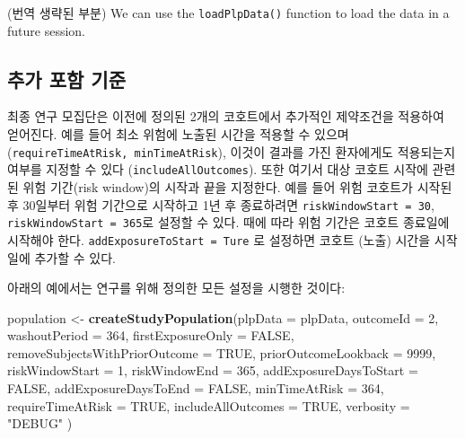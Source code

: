 \documentclass[10.5pt]{book}
\newenvironment{Shaded}{\begin{snugshade}}{\end{snugshade}}
\newcommand{\KeywordTok}[1]{\textcolor[rgb]{0.13,0.29,0.53}{\textbf{#1}}}
\newcommand{\DataTypeTok}[1]{\textcolor[rgb]{0.13,0.29,0.53}{#1}}
\newcommand{\DecValTok}[1]{\textcolor[rgb]{0.00,0.00,0.81}{#1}}
\newcommand{\StringTok}[1]{\textcolor[rgb]{0.31,0.60,0.02}{#1}}
\newcommand{\OtherTok}[1]{\textcolor[rgb]{0.56,0.35,0.01}{#1}}
\newcommand{\NormalTok}[1]{#1}
\theoremstyle{definition}
\theoremstyle{definition}
\theoremstyle{definition}
\theoremstyle{remark}
\begin{document}
(번역 생략된 부분) We can use the \texttt{loadPlpData()} function to
load the data in a future session.

\subsection{추가 포함 기준}\label{--}

최종 연구 모집단은 이전에 정의된 2개의 코호트에서 추가적인 제약조건을
적용하여 얻어진다. 예를 들어 최소 위험에 노출된 시간을 적용할 수 있으며
(\texttt{requireTimeAtRisk,\ minTimeAtRisk}), 이것이 결과를 가진
환자에게도 적용되는지 여부를 지정할 수 있다
(\texttt{includeAllOutcomes}). 또한 여기서 대상 코호트 시작에 관련된
위험 기간(risk window)의 시작과 끝을 지정한다. 예를 들어 위험 코호트가
시작된 후 30일부터 위험 기간으로 시작하고 1년 후 종료하려면
\texttt{riskWindowStart\ =\ 30}, \texttt{riskWindowStart\ =\ 365}로
설정할 수 있다. 때에 따라 위험 기간은 코호트 종료일에 시작해야 한다.
\texttt{addExposureToStart\ =\ Ture} 로 설정하면 코호트 (노출) 시간을
시작일에 추가할 수 있다.

아래의 예에서는 연구를 위해 정의한 모든 설정을 시행한 것이다:

\begin{Shaded}
\begin{Highlighting}[]
\NormalTok{population <-}\StringTok{ }\KeywordTok{createStudyPopulation}\NormalTok{(}\DataTypeTok{plpData =}\NormalTok{ plpData,}
                                    \DataTypeTok{outcomeId =} \DecValTok{2}\NormalTok{,}
                                    \DataTypeTok{washoutPeriod =} \DecValTok{364}\NormalTok{,}
                                    \DataTypeTok{firstExposureOnly =} \OtherTok{FALSE}\NormalTok{,}
                                    \DataTypeTok{removeSubjectsWithPriorOutcome =} \OtherTok{TRUE}\NormalTok{,}
                                    \DataTypeTok{priorOutcomeLookback =} \DecValTok{9999}\NormalTok{,}
                                    \DataTypeTok{riskWindowStart =} \DecValTok{1}\NormalTok{,}
                                    \DataTypeTok{riskWindowEnd =} \DecValTok{365}\NormalTok{,}
                                    \DataTypeTok{addExposureDaysToStart =} \OtherTok{FALSE}\NormalTok{,}
                                    \DataTypeTok{addExposureDaysToEnd =} \OtherTok{FALSE}\NormalTok{,}
                                    \DataTypeTok{minTimeAtRisk =} \DecValTok{364}\NormalTok{,}
                                    \DataTypeTok{requireTimeAtRisk =} \OtherTok{TRUE}\NormalTok{,}
                                    \DataTypeTok{includeAllOutcomes =} \OtherTok{TRUE}\NormalTok{,}
                                    \DataTypeTok{verbosity =} \StringTok{"DEBUG"}
\NormalTok{)}
\end{Highlighting}
\end{Shaded}
\end{document}
